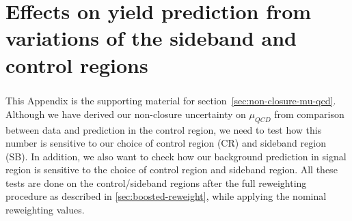 \chapter{Effects on yield prediction from variations of the sideband and control regions}
\label{app:appendixSysVar}

\paragraph{}
This Appendix is the supporting material for section~\ref{sec:non-closure-mu-qcd}. 
Although we have derived our non-closure uncertainty on $\mu_{QCD}$ from comparison between data and prediction in the control region, we need to test how this number is sensitive to our choice of control region (CR) and sideband region (SB). In addition, we also want to check how our background prediction in signal region is sensitive to the choice of control region and sideband region. All these tests are done on the control/sideband regions after the full reweighting procedure as described in \ref{sec:boosted-reweight}, while applying the nominal reweighting values.

